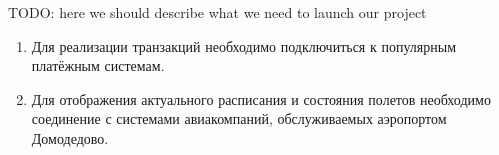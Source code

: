 TODO: here we should describe what we need to launch our project

\begin{enumerate}
    \item Для реализации транзакций необходимо подключиться к популярным платёжным системам.
    \item Для отображения актуального расписания и состояния полетов необходимо соединение с системами авиакомпаний, 
    обслуживаемых аэропортом Домодедово.
\end{enumerate}


